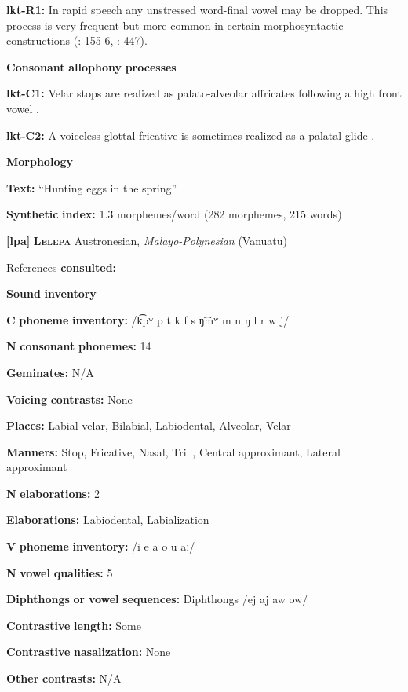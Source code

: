 \begin{styleBody}
\textbf{lkt-R1:} In rapid speech any unstressed word-final vowel may be dropped. This process is very frequent but more common in certain morphosyntactic constructions (\citealt{Mirzayan2010}: 155-6, \citealt{RoodTaylor1996}: 447).

\textbf{Consonant} \textbf{allophony} \textbf{processes}

\textbf{lkt-C1:} Velar stops are realized as palato-alveolar affricates following a high front vowel \citep[6]{Ingham2003}.

\textbf{lkt-C2:} A voiceless glottal fricative is sometimes realized as a palatal glide \citep{Ingham2003}.

\textbf{Morphology}

\textbf{Text:} “Hunting eggs in the spring” \citep[95-96]{Ingham2003}

\textbf{Synthetic} \textbf{index:} 1.3 morphemes/word (282 morphemes, 215 words)

\textbf{[lpa]}   \textbf{\textsc{Lelepa}}  Austronesian, \textit{Malayo-Polynesian} (Vanuatu)

References \textbf{consulted:} \citet{Lacrampe2014}

\textbf{Sound} \textbf{inventory}

\textbf{C} \textbf{phoneme} \textbf{inventory:} /k͡pʷ p t k f s ŋ͡mʷ m n ŋ l r w j/

\textbf{N} \textbf{consonant} \textbf{phonemes:} 14

\textbf{Geminates:} N/A

\textbf{Voicing} \textbf{contrasts:} None

\textbf{Places:} Labial-velar, Bilabial, Labiodental, Alveolar, Velar

\textbf{Manners:} Stop, Fricative, Nasal, Trill, Central approximant, Lateral approximant

\textbf{N} \textbf{elaborations:} 2

\textbf{Elaborations:} Labiodental, Labialization

\textbf{V} \textbf{phoneme} \textbf{inventory:} /i e a o u aː/

\textbf{N} \textbf{vowel} \textbf{qualities:} 5

\textbf{Diphthongs} \textbf{or} \textbf{vowel} \textbf{sequences:} Diphthongs /ej aj aw ow/

\textbf{Contrastive} \textbf{length:} Some

\textbf{Contrastive} \textbf{nasalization:} None

\textbf{Other} \textbf{contrasts:} N/A


\end{styleBody}
